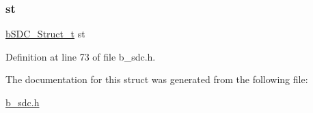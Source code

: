 \subsubsection{\texorpdfstring{st}{st}}
{\footnotesize\ttfamily \mbox{\hyperlink{structb_s_d_c___struct__t}{b\+S\+D\+C\+\_\+\+Struct\+\_\+t}} st}



Definition at line 73 of file b\+\_\+sdc.\+h.



The documentation for this struct was generated from the following file\+:\begin{DoxyCompactItemize}
\item 
\mbox{\hyperlink{b__sdc_8h}{b\+\_\+sdc.\+h}}\end{DoxyCompactItemize}
